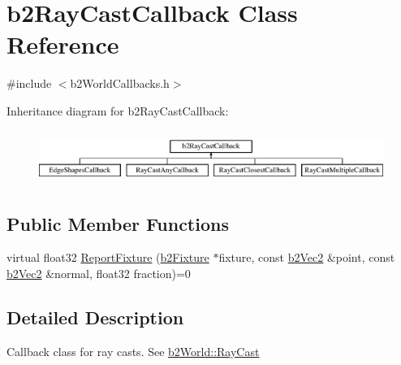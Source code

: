 \hypertarget{classb2_ray_cast_callback}{\section{b2\-Ray\-Cast\-Callback Class Reference}
\label{classb2_ray_cast_callback}
}


{\ttfamily \#include $<$b2\-World\-Callbacks.\-h$>$}

Inheritance diagram for b2\-Ray\-Cast\-Callback\-:\begin{figure}[H]
\begin{center}
\leavevmode
\includegraphics[height=1.750000cm]{classb2_ray_cast_callback}
\end{center}
\end{figure}
\subsection*{Public Member Functions}
\begin{DoxyCompactItemize}
\item 
virtual float32 \hyperlink{classb2_ray_cast_callback_a658d5c8e89e0c73230cc8bddade4f3a4}{Report\-Fixture} (\hyperlink{classb2_fixture}{b2\-Fixture} $\ast$fixture, const \hyperlink{structb2_vec2}{b2\-Vec2} \&point, const \hyperlink{structb2_vec2}{b2\-Vec2} \&normal, float32 fraction)=0
\end{DoxyCompactItemize}


\subsection{Detailed Description}
Callback class for ray casts. See \hyperlink{classb2_world_ad902548be84df9cc36eced0f4c89ab0a}{b2\-World\-::\-Ray\-Cast} 

